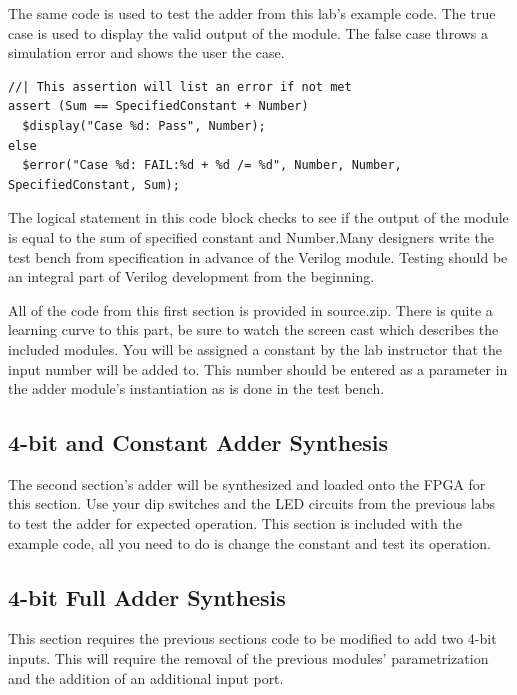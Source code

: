 \documentclass[12pt,journal]{IEEEtran}
\begin{document}
    The same code is used to test the adder from this lab's example code. The true case is used to display the valid output of the module. The false case throws a simulation error and shows the user the case. 
    \begin{lstlisting}[caption={Assertion Example from test bench}]
//| This assertion will list an error if not met
assert (Sum == SpecifiedConstant + Number)
  $display("Case %d: Pass", Number);
else
  $error("Case %d: FAIL:%d + %d /= %d", Number, Number, SpecifiedConstant, Sum);
    \end{lstlisting} 
    The logical statement in this code block checks to see if the output of the module is equal to the sum of specified constant and Number.Many designers write the test bench from specification in advance of the Verilog module. Testing should be an integral part of Verilog development from the beginning.

    All of the code from this first section is provided in source.zip. There is quite a learning curve to this part, be sure to watch the screen cast which describes the included modules. You will be assigned a constant by the lab instructor that the input number will be added to. This number should be entered as a parameter in the adder module's instantiation as is done in the test bench.

  \subsection{4-bit and Constant Adder Synthesis}
    The second section's adder will be synthesized and loaded onto the FPGA for this section. Use your dip switches and the LED circuits from the previous labs to test the adder for expected operation. This section is included with the example code, all you need to do is change the constant and test its operation.  

  \subsection{4-bit Full Adder Synthesis}
    This section requires the previous sections code to be modified to add two 4-bit inputs. This will require the removal of the previous modules' parametrization and the addition of an additional input port. 
\end{document}
